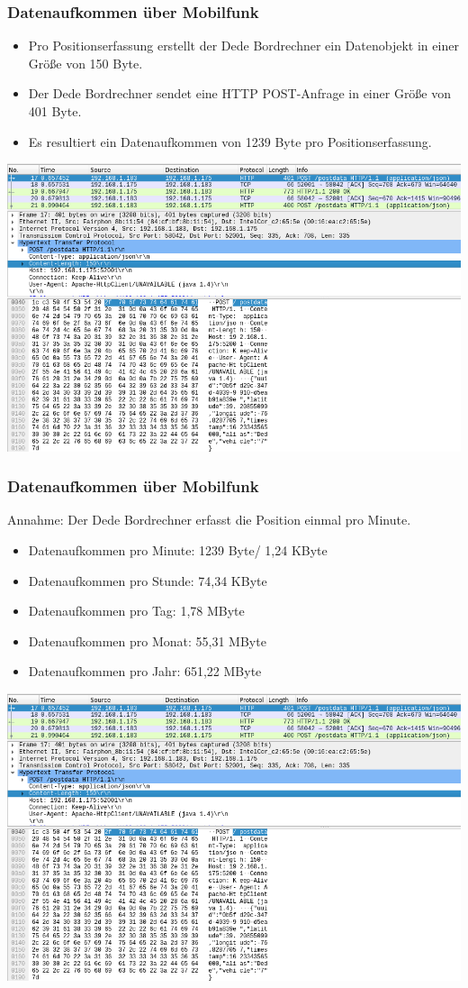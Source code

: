 \begin{frame}
  \frametitle{Datenaufkommen über Mobilfunk}
  \begin{itemize}
  \item Pro Positionserfassung erstellt der Dede Bordrechner ein Datenobjekt in einer Größe von 150 Byte.
  \item Der Dede Bordrechner sendet eine HTTP POST-Anfrage in einer Größe von 401 Byte.
  \item Es resultiert ein Datenaufkommen von 1239 Byte pro Positionserfassung.
  \end{itemize}
  \includegraphics[width=0.5\paperwidth]{dede/dede-obc-wireshark-http-post}
\end{frame}

\begin{frame}
  \frametitle{Datenaufkommen über Mobilfunk}
  Annahme: Der Dede Bordrechner erfasst die Position einmal pro Minute.
  \begin{itemize}
  \item Datenaufkommen pro Minute: 1239 Byte/ 1,24 KByte
  \item Datenaufkommen pro Stunde: 74,34 KByte
  \item Datenaufkommen pro Tag: 1,78 MByte
  \item Datenaufkommen pro Monat: 55,31 MByte
  \item Datenaufkommen pro Jahr: 651,22 MByte
  \end{itemize}
  \includegraphics[width=0.5\paperwidth]{dede/dede-obc-wireshark-http-post}
\end{frame}
